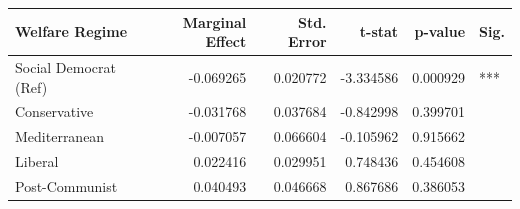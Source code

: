 \begin{tabular}{lrrrrl}
\toprule
Welfare Regime & Marginal Effect & Std. Error & t-stat & p-value & Sig. \\
\midrule
Social Democrat (Ref) & -0.069265 & 0.020772 & -3.334586 & 0.000929 & *** \\
Conservative & -0.031768 & 0.037684 & -0.842998 & 0.399701 &  \\
Mediterranean & -0.007057 & 0.066604 & -0.105962 & 0.915662 &  \\
Liberal & 0.022416 & 0.029951 & 0.748436 & 0.454608 &  \\
Post-Communist & 0.040493 & 0.046668 & 0.867686 & 0.386053 &  \\
\bottomrule
\end{tabular}

